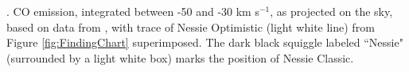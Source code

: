 \textbf{\label{fig:COarm}}. CO emission, integrated between -50 and -30 km s$^{-1}$, as projected on the sky, based on data from \citep{Dame2001}, with trace of Nessie Optimistic (light white line) from Figure \ref{fig:FindingChart} superimposed. The dark black squiggle labeled ``Nessie" (surrounded by a light white box) marks the position of Nessie Classic.